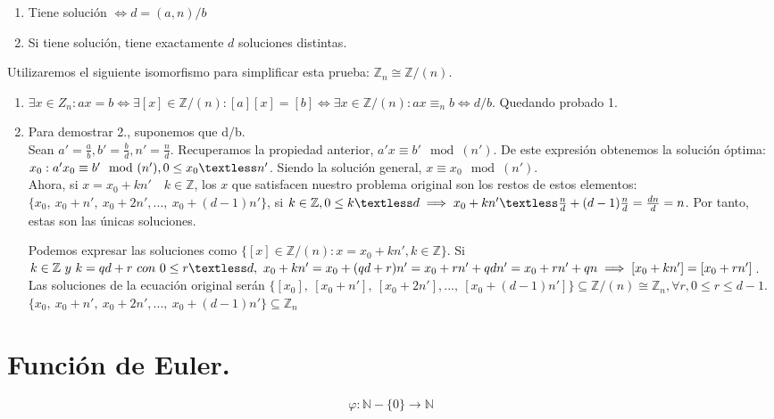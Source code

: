 \documentclass[11pt, a4paper, titlepage]{article}
\makeatletter
\newif\IfInSansMode
\let\oldsf\sffamily
\renewcommand*{\sffamily}{\oldsf\mathversion{sans}\InSansModetrue}
\let\oldnorm\normalfont
\renewcommand*{\normalfont}{\oldnorm\InSansModefalse\mathversion{normal}}
\renewenvironment{proof}[1][\proofname] {\vspace{-15pt}\par\pushQED{\qed}\normalfont\topsep6\p@\@plus6\p@\relax\trivlist\item[\hskip\labelsep\it#1\@addpunct{.}]\ignorespaces}{\popQED\endtrivlist\@endpefalse}
\providecommand{\ent}{\mathbb{Z}}
\renewenvironment{proof}[1][\proofname] {\par\pushQED{\qed}\normalfont\topsep6\p@\@plus6\p@\relax\trivlist\item[\hskip\labelsep\itshape\sffamily#1\@addpunct{.}]\ignorespaces}{\popQED\endtrivlist\@endpefalse}
\theoremstyle{theorem-style}
\theoremstyle{definition-style}
\theoremstyle{remark-style}
\theoremstyle{example-style}
\makeatother
\begin{document}
\begin{enumerate}
	\item Tiene solución $\iff d =(a,n)/b$

	\item Si tiene solución, tiene exactamente $d$ soluciones distintas.
\end{enumerate}

\begin{proof}
Utilizaremos el siguiente isomorfismo para simplificar esta prueba: $\ent_n \cong \ent/(n)$.\\
\begin{enumerate}
	\item $\exists x \in Z_n :  ax = b \iff \exists[x] \in \ent/(n) : [a][x] = [b] \iff \exists x \in \ent /(n) : ax \equiv_n b \iff d/b$. Quedando probado 1.
	\item  Para demostrar 2., suponemos que d/b.\\
	 Sean $a' = \frac{a}{b}, b' = \frac{b}{d}, n' = \frac{n}{d}$. Recuperamos la propiedad anterior, $a'x \equiv b'\mod(n')$. De este expresión obtenemos la solución óptima: $x_0 : a'x_0 \equiv b'\mod(n'), 0 \le x_0 \textless n'$. Siendo la solución general, $x \equiv x_0 \mod(n')$.\\
Ahora, si $x = x_0 + kn' \quad k \in \ent$, los $x$ que satisfacen nuestro problema original son los restos de estos elementos:\quad $\{x_0,\ x_0 + n',\ x_0 +2n',...,\ x_0 + (d-1)n'\}$, si $k \in \ent, 0 \le k \textless d \implies x_0 + kn' \textless \frac{n}{d} + (d-1)\frac{n}{d} = \frac{dn}{d} = n$. Por tanto, estas son las únicas soluciones.

Podemos expresar las soluciones como $\{ [x] \in \ent /(n) : x = x_0 + kn', k \in \ent\}$. Si $k \in \ent \ y \ k = qd + r \ con \ 0 \le r \textless d, \ x_0 + kn' = x_0 + (qd + r)n' = x_0 + rn' + qdn'= x_0 + rn' +qn \implies [x_0 + kn'] = [x_0 + rn']$. Las soluciones de la ecuación original serán $\{[x_0],\ [x_0 + n'],\ [x_0 +2n'],...,\ [x_0 + (d-1)n']\} \subseteq \ent /(n) \cong \ent _n, \forall r, 0 \le r \le d - 1.$
$\{x_0,\ x_0 + n',\ x_0 +2n',...,\ x_0 + (d-1)n'\} \subseteq \ent _n$
\end{enumerate}



\end{proof}

\section{Función de Euler.}
\[
  \varphi : \mathbb{N}-\{0\} \longrightarrow \mathbb{N}
\]
\end{document}
